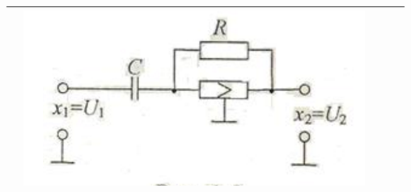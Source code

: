 \documentclass[14pt,a4paper,report]{report}
\begin{document}
\begin{table}[h!]
\begin{tabular}{ | m{3cm} | m{2.5cm} | m{4.5cm} | m{2.5cm} | m{2.5cm} }
\begin{minipage}{.3\textwidth}
		\end{minipage}
		&
		\begin{minipage}{.3\textwidth}
			\includegraphics[scale = 0.3]{images/2_5.png}
		\end{minipage} \\ \hline
	\end{tabular}
	\egroup
\end{table}
\end{document}
